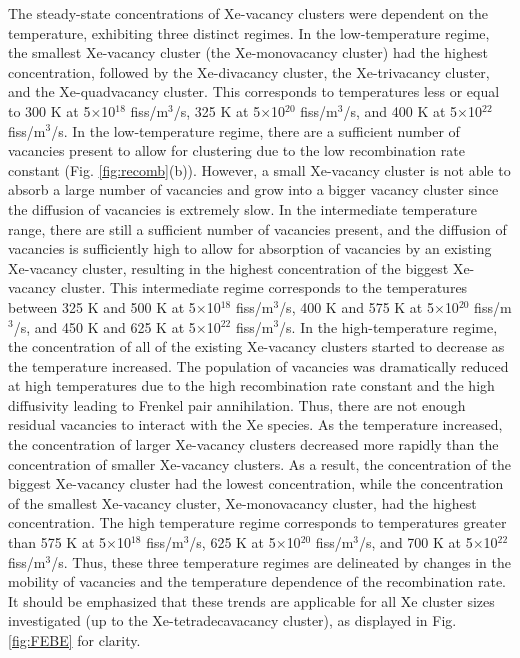 \documentclass[preprint,12pt]{elsarticle}
\begin{document}
The steady-state concentrations of Xe-vacancy clusters were dependent on the temperature, exhibiting three distinct regimes. In the low-temperature regime, the smallest Xe-vacancy cluster (the Xe-monovacancy cluster) had the highest concentration, followed by the Xe-divacancy cluster, the Xe-trivacancy cluster, and the Xe-quadvacancy cluster. This corresponds to temperatures less or equal to 300 K at 5$\times$10$^{18}$ fiss/m$^{3}$/s, 325 K at 5$\times$10$^{20}$ fiss/m$^{3}$/s, and 400 K at 5$\times$10$^{22}$ fiss/m$^{3}$/s. In the low-temperature regime, there are a sufficient number of vacancies present to allow for clustering due to the low recombination rate constant (Fig. \ref{fig:recomb}(b)). However, a small Xe-vacancy cluster is not able to absorb a large number of vacancies and grow into a bigger vacancy cluster since the diffusion of vacancies is extremely slow. In the intermediate temperature range, there are still a sufficient number of vacancies present, and the diffusion of vacancies is sufficiently high to allow for absorption of vacancies by an existing Xe-vacancy cluster, resulting in the highest concentration of the biggest Xe-vacancy cluster. This intermediate regime corresponds to the temperatures between 325 K and 500 K at 5$\times$10$^{18}$ fiss/m$^{3}$/s, 400 K and 575 K at 5$\times$10$^{20}$ fiss/m$^{3}$/s, and 450 K and 625 K at 5$\times$10$^{22}$ fiss/m$^{3}$/s. In the high-temperature regime, the concentration of all of the existing Xe-vacancy clusters started to decrease as the temperature increased. The population of vacancies was dramatically reduced at high temperatures due to the high recombination rate constant and the high diffusivity leading to Frenkel pair annihilation. Thus, there are not enough residual vacancies to interact with the Xe species. As the temperature increased, the concentration of larger Xe-vacancy clusters decreased more rapidly than the concentration of smaller Xe-vacancy clusters. As a result, the concentration of the biggest Xe-vacancy cluster had the lowest concentration, while the concentration of the smallest Xe-vacancy cluster, Xe-monovacancy cluster, had the highest concentration. The high temperature regime corresponds to temperatures greater than 575 K at 5$\times$10$^{18}$ fiss/m$^{3}$/s, 625 K at 5$\times$10$^{20}$ fiss/m$^{3}$/s, and 700 K at 5$\times$10$^{22}$ fiss/m$^{3}$/s. Thus, these three temperature regimes are delineated by changes in the mobility of vacancies and the temperature dependence of the recombination rate. It should be emphasized that these trends are applicable for all Xe cluster sizes investigated (up to the Xe-tetradecavacancy cluster), as displayed in Fig. \ref{fig:FEBE} for clarity. \\
\end{document}
